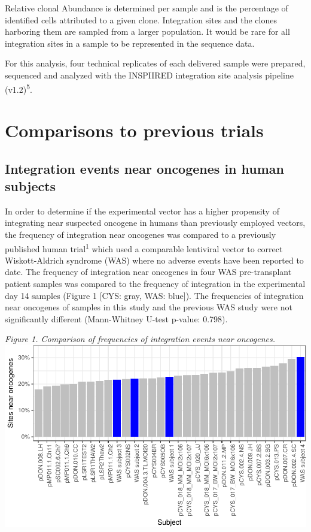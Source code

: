 \documentclass[12pt,]{article}
\begin{document}
Relative clonal Abundance is determined per sample and is the percentage
of identified cells attributed to a given clone. Integration sites and
the clones harboring them are sampled from a larger population. It would
be rare for all integration sites in a sample to be represented in the
sequence data.

For this analysis, four technical replicates of each delivered sample
were prepared, sequenced and analyzed with the INSPIIRED integration
site analysis pipeline (v1.2)\textsuperscript{5}.

\newpage

\section{Comparisons to previous
trials}\label{comparisons-to-previous-trials}

\subsection{Integration events near oncogenes in human
subjects}\label{integration-events-near-oncogenes-in-human-subjects}

In order to determine if the experimental vector has a higher propensity
of integrating near suspected oncogene in humans than previously
employed vectors, the frequency of integration near oncogenes was
compared to a previously published human trial\textsuperscript{1} which
used a comparable lentiviral vector to correct Wiskott-Aldrich syndrome
(WAS) where no adverse events have been reported to date. The frequency
of integration near oncogenes in four WAS pre-transplant patient samples
was compared to the frequency of integration in the experimental day 14
samples (Figure 1 {[}CYS: gray, WAS: blue{]}). The frequencies of
integration near oncogenes of samples in this study and the previous WAS
study were not significantly different (Mann-Whitney U-test p-value:
0.798).

\vspace{0.1cm}

\emph{Figure 1. Comparison of frequencies of integration events near
oncogenes.}\\
\includegraphics{project_files/figure-latex/fig1-1.pdf}
\end{document}
